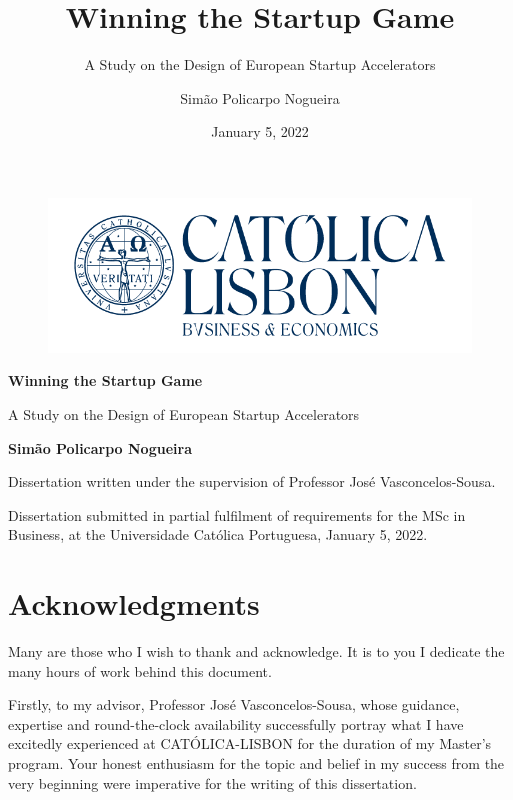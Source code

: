 \documentclass[
  12pt,
]{article}
\title{Winning the Startup Game}
\subtitle{A Study on the Design of European Startup Accelerators}
\author{Simão Policarpo Nogueira}
\date{January 5, 2022}
\begin{document}
\maketitle


\begin{figure}

{\centering \includegraphics[width=0.5\linewidth]{./writing/figures/logo_catolica} 

}

\end{figure}

\begin{centering}
\vfill
\begin{spacing}{1}
{\Huge\bf Winning the Startup Game}\\
\vspace{1em}
\parbox{28em}{\centering\Huge A Study on the Design of European Startup Accelerators}
\end{spacing}
\vfill 
{\LARGE\bf Simão Policarpo Nogueira}
\vfill 
\parbox{25em}{\centering\Large Dissertation written under the supervision of Professor José Vasconcelos-Sousa.} 
\vfill 
\parbox{38em}{\centering\Large Dissertation submitted in partial fulfilment of requirements for the MSc in Business, at the Universidade Católica Portuguesa, January 5, 2022.}

\end{centering}
\clearpage
{}

\clearpage

\hypertarget{acknowledgments}{%
\section*{Acknowledgments}\label{acknowledgments}}

Many are those who I wish to thank and acknowledge. It is to you I dedicate the many hours of work behind this document.

Firstly, to my advisor, Professor José Vasconcelos-Sousa, whose guidance, expertise and round-the-clock availability successfully portray what I have excitedly experienced at CATÓLICA-LISBON for the duration of my Master's program. Your honest enthusiasm for the topic and belief in my success from the very beginning were imperative for the writing of this dissertation.
\end{document}
